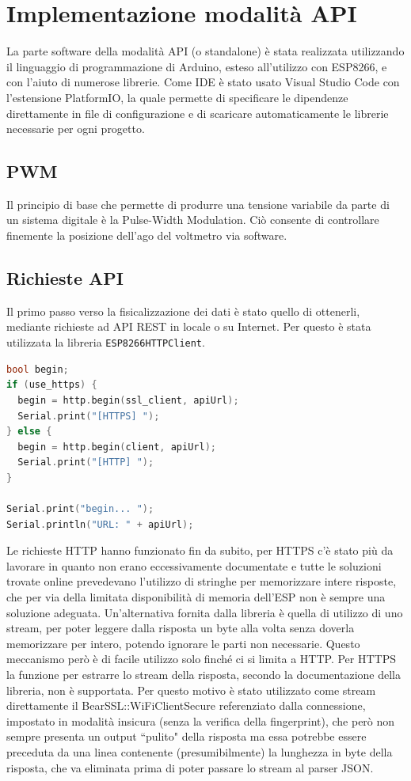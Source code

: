\documentclass[12pt,a4paper]{report}
\begin{document}
\section{Implementazione modalità API}
La parte software della modalità API (o standalone) è stata realizzata utilizzando il linguaggio di programmazione di Arduino, esteso
all'utilizzo con ESP8266, e con l'aiuto di numerose librerie.
Come IDE è stato usato Visual Studio Code con l'estensione PlatformIO, la quale permette di specificare le dipendenze direttamente
in file di configurazione e di scaricare automaticamente le librerie necessarie per ogni progetto.

\subsection{PWM}
Il principio di base che permette di produrre una tensione variabile da parte di un sistema digitale è la Pulse-Width Modulation.
Ciò consente di controllare finemente la posizione dell'ago del voltmetro via software.

\subsection{Richieste API}
Il primo passo verso la fisicalizzazione dei dati è stato quello di ottenerli, mediante richieste ad API REST in locale o su Internet.
Per questo è stata utilizzata la libreria \texttt{ESP8266HTTPClient}.


\begin{lstlisting}[language=cpp]
bool begin;
if (use_https) {
  begin = http.begin(ssl_client, apiUrl);
  Serial.print("[HTTPS] ");
} else {
  begin = http.begin(client, apiUrl);
  Serial.print("[HTTP] ");
}

Serial.print("begin... ");
Serial.println("URL: " + apiUrl);
\end{lstlisting}

Le richieste HTTP hanno funzionato fin da subito, per HTTPS c'è stato più da lavorare in quanto non erano eccessivamente
documentate e tutte le soluzioni trovate online prevedevano l'utilizzo di stringhe per memorizzare intere risposte, che per via
della limitata disponibilità di memoria dell'ESP non è sempre una soluzione adeguata.
Un'alternativa fornita dalla libreria è quella di utilizzo di uno stream, per poter leggere dalla risposta un byte alla volta senza doverla
memorizzare per intero, potendo ignorare le parti non necessarie. Questo meccanismo però è di facile utilizzo solo finché ci si limita a
HTTP. Per HTTPS la funzione per estrarre lo stream della risposta, secondo la documentazione della libreria, non è supportata.
Per questo motivo è stato utilizzato come stream direttamente il BearSSL::WiFiClientSecure referenziato dalla connessione, impostato in
modalità insicura (senza la verifica della fingerprint), che però non sempre presenta un output  ``pulito" della risposta ma essa potrebbe
essere preceduta da una linea contenente (presumibilmente) la lunghezza in byte della risposta, che va eliminata prima di poter
passare lo stream al parser JSON.
\end{document}

